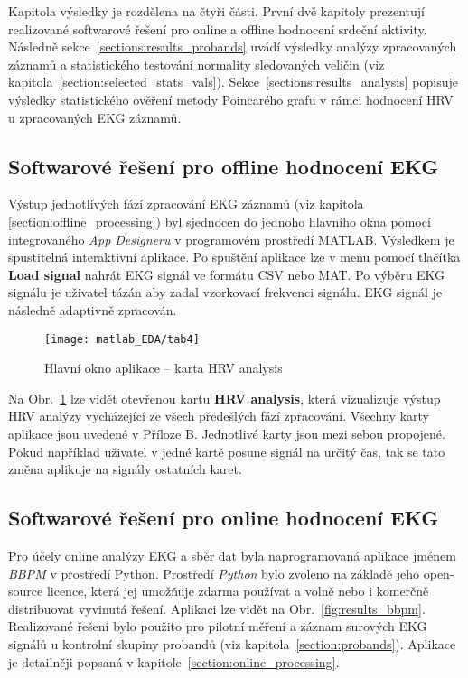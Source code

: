 Kapitola výsledky je rozdělena na čtyři části. První dvě kapitoly prezentují
realizované softwarové řešení pro online a offline hodnocení srdeční aktivity.
Následně sekce~\ref{sections:results_probands} uvádí výsledky analýzy
zpracovaných záznamů a statistického testování normality sledovaných veličin
(viz kapitola~\ref{section:selected_stats_vals}).
Sekce~\ref{sections:results_analysis} popisuje výsledky statistického ověření
metody Poincarého grafu v rámci hodnocení HRV u zpracovaných EKG záznamů.

\subsection{Softwarové řešení pro offline hodnocení EKG}
\label{sections:results_online}
Výstup jednotlivých fází zpracování EKG záznamů (viz kapitola
\ref{section:offline_processing}) byl sjednocen do jednoho hlavního okna pomocí
integrovaného \textit{App Designeru} \cite{matlabAPPDESIGNER} v programovém
prostředí MATLAB. Výsledkem je spustitelná interaktivní aplikace. Po
spuštění aplikace lze v menu pomocí tlačítka \textbf{Load signal} nahrát EKG
signál ve formátu CSV nebo MAT. Po výběru EKG signálu je uživatel tázán aby
zadal vzorkovací frekvenci signálu. EKG signál je následně adaptivně zpracován.
\begin{figure}[h]
	\begin{center}
		\texttt{[image: matlab\_EDA/tab4]}
		\caption{Hlavní okno aplikace -- karta HRV analysis}
		\label{fig:results_matlab_tab4}
	\end{center}
\end{figure}
Na Obr.~\ref{fig:results_matlab_tab4} lze vidět otevřenou kartu \textbf{HRV
analysis}, která vizualizuje výstup HRV analýzy vycházející ze všech předešlých
fází zpracování. Všechny karty aplikace jsou uvedené v Příloze B. Jednotlivé
karty jsou mezi sebou propojené. Pokud například uživatel v jedné kartě posune
signál na určitý čas, tak se tato změna aplikuje na signály ostatních karet.

\subsection{Softwarové řešení pro online hodnocení EKG}
\label{sections:result_offline}
Pro účely online analýzy EKG a sběr dat byla naprogramovaná aplikace jménem
\textit{BBPM} v prostředí Python. Prostředí \textit{Python} bylo
zvoleno na základě jeho open-source licence, která jej umožňuje zdarma používat
a volně nebo i komerčně distribuovat vyvinutá řešení. Aplikaci lze vidět na
Obr.~\ref{fig:results_bbpm}. Realizované řešení bylo použito pro pilotní měření
a záznam surových EKG signálů u kontrolní skupiny probandů (viz
kapitola~\ref{section:probands}). Aplikace je detailněji popsaná v
kapitole~\ref{section:online_processing}.

